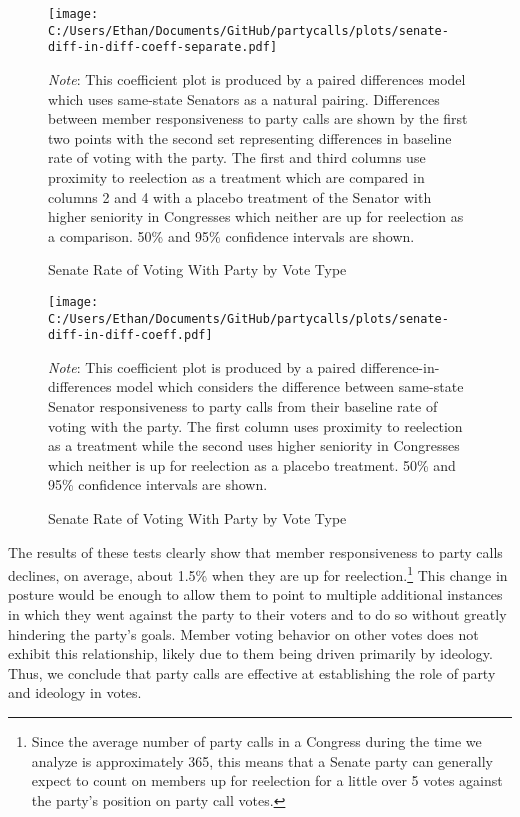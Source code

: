 \documentclass[12pt]{article}
\newcommand\fnote[1]{\captionsetup{font=small}\caption*{#1}}
\begin{document}
\begin{figure}[H]
	\centering
	\caption{Senate Rate of Voting With Party by Vote Type}
	\texttt{[image: C:/Users/Ethan/Documents/GitHub/partycalls/plots/senate-diff-in-diff-coeff-separate.pdf]}
	\fnote{\textit{Note}: This coefficient plot is produced by a paired differences model which uses same-state Senators as a natural pairing. Differences between member responsiveness to party calls are shown by the first two points with the second set representing differences in baseline rate of voting with the party. The first and third columns use proximity to reelection as a treatment which are compared in columns 2 and 4 with a placebo treatment of the Senator with higher seniority in Congresses which neither are up for reelection as a comparison. 50\% and 95\% confidence intervals are shown.}
\end{figure}

\begin{figure}[H]
	\centering
	\caption{Senate Rate of Voting With Party by Vote Type}
	\texttt{[image: C:/Users/Ethan/Documents/GitHub/partycalls/plots/senate-diff-in-diff-coeff.pdf]}
	\fnote{\textit{Note}: This coefficient plot is produced by a paired difference-in-differences model which considers the difference between same-state Senator responsiveness to party calls from their baseline rate of voting with the party. The first column uses proximity to reelection as a treatment while the second uses higher seniority in Congresses which neither is up for reelection as a placebo treatment. 50\% and 95\% confidence intervals are shown.}
\end{figure}

The results of these tests clearly show that member responsiveness to party calls declines, on average, about 1.5\% when they are up for reelection.\footnote{Since the average number of party calls in a Congress during the time we analyze is approximately 365, this means that a Senate party can generally expect to count on members up for reelection for a little over 5 votes against the party's position on party call votes.} This change in posture would be enough to allow them to point to multiple additional instances in which they went against the party to their voters and to do so without greatly hindering the party's goals. Member voting behavior on other votes does not exhibit this relationship, likely due to them being driven primarily by ideology. Thus, we conclude that party calls are effective at establishing the role of party and ideology in votes.
\end{document}
